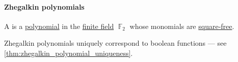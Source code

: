 \paragraph{Zhegalkin polynomials}

\begin{definition}\label{def:zhegalkin_polynomial}
  A  is a \hyperref[def:polynomial_algebra/polynomials]{polynomial} in the \hyperref[def:finite_field]{finite field} \( \BbbF_2 \) whose monomials are \hyperref[def:square_free_element]{square-free}.
\end{definition}
\begin{comments}
  \item Zhegalkin polynomials uniquely correspond to boolean functions --- see \cref{thm:zhegalkin_polynomial_uniqueness}.
\end{comments}

